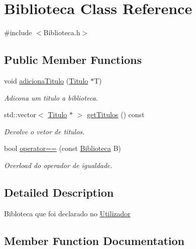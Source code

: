 \hypertarget{classBiblioteca}{}\section{Biblioteca Class Reference}
\label{classBiblioteca}


{\ttfamily \#include $<$Biblioteca.\+h$>$}

\subsection*{Public Member Functions}
\begin{DoxyCompactItemize}
\item 
void \hyperlink{classBiblioteca_af10c9f23d85db8e03ae2e8b9d3e593e1}{adiciona\+Titulo} (\hyperlink{classTitulo}{Titulo} $\ast$T)
\begin{DoxyCompactList}\small\item\em Adicona um titulo a biblioteca. \end{DoxyCompactList}\item 
std\+::vector$<$ \hyperlink{classTitulo}{Titulo} $\ast$ $>$ \hyperlink{classBiblioteca_a03c1ebf76a4ace4f57000bb99a87bb88}{get\+Titulos} () const
\begin{DoxyCompactList}\small\item\em Devolve o vetor de titulos. \end{DoxyCompactList}\item 
bool \hyperlink{classBiblioteca_a962423a2d93507ad7348e9b8c83eb1b8}{operator==} (const \hyperlink{classBiblioteca}{Biblioteca} B)
\begin{DoxyCompactList}\small\item\em Overload do operador de igualdade. \end{DoxyCompactList}\end{DoxyCompactItemize}


\subsection{Detailed Description}
Bibloteca que foi declarado no \hyperlink{classUtilizador}{Utilizador} 

\subsection{Member Function Documentation}
\mbox{\label{classBiblioteca_af10c9f23d85db8e03ae2e8b9d3e593e1}} 
